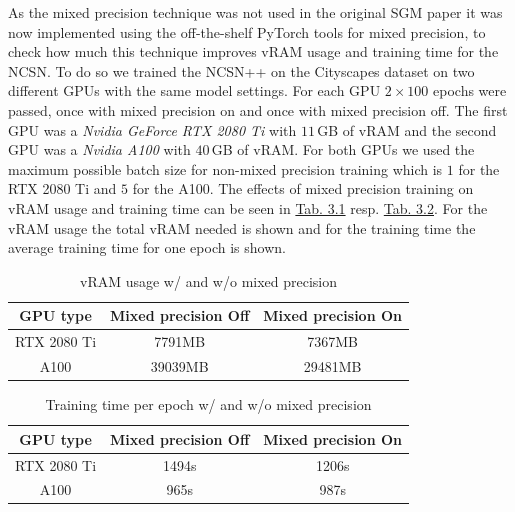 As the mixed precision technique was not used in the original SGM paper \cite{score_3} it was now implemented using the off-the-shelf PyTorch tools for mixed precision, to check how much this technique improves vRAM usage and training time for the NCSN. To do so we trained the NCSN++ on the Cityscapes dataset on two different GPUs with the same model settings. For each GPU $2\times100$ epochs were passed, once with mixed precision on and once with mixed precision off. The first GPU was a \textit{Nvidia GeForce RTX 2080 Ti} with $11$\,GB of vRAM and the second GPU was a \textit{Nvidia A100} with $40$\,GB of vRAM. For both GPUs we used the maximum possible batch size for non-mixed precision training which is $1$ for the RTX 2080 Ti and $5$ for the A100. The effects of mixed precision training on vRAM usage and training time can be seen in \hyperref[tab:3.1]{Tab. 3.1} resp. \hyperref[tab:3.1]{Tab. 3.2}. For the vRAM usage the total vRAM needed is shown and for the training time the average training time for one epoch is shown.
%
\begin{table}[] \label{tab:3.1}
        \centering
    \begin{tabular}{c|c|c}
        \toprule
        GPU type        & Mixed precision \textbf{Off}    & Mixed precision \textbf{On} \\
        \midrule
        RTX 2080 Ti     &  7791MB               & 7367MB\\
        A100            &  39039MB              & 29481MB\\
        \bottomrule
    \end{tabular}
    \caption{vRAM usage w/ and w/o mixed precision}
\end{table}
\begin{table}[b] \label{tab:3.2}
        \centering
    \begin{tabular}{c|c|c}
        \toprule
        GPU type        & Mixed precision \textbf{Off}    & Mixed precision \textbf{On} \\
        \midrule
        RTX 2080 Ti     &  1494s                & 1206s    \\
        A100            &  965s                 & 987s\\
        \bottomrule
    \end{tabular}
    \caption{Training time per epoch w/ and w/o mixed precision}
\end{table}

